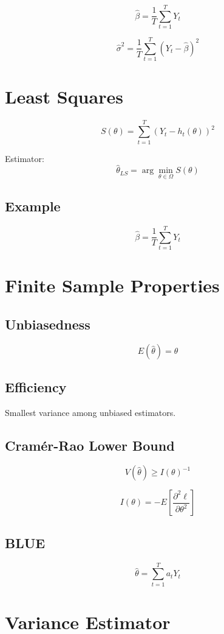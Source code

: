 \[
\hat{\beta} = \frac{1}{T} \sum_{t=1}^T Y_t
\]

\[
\hat{\sigma}^2 = \frac{1}{T} \sum_{t=1}^T (Y_t - \hat{\beta})^2
\]

\section{Least Squares}

\[
S(\theta) = \sum_{t=1}^T (Y_t - h_t(\theta))^2
\]

Estimator:
\[
\hat{\theta}_{LS} = \arg\min_{\theta \in \Omega} S(\theta)
\]

\subsection{Example}

\[
\hat{\beta} = \frac{1}{T} \sum_{t=1}^T Y_t
\]

\section{Finite Sample Properties}

\subsection{Unbiasedness}

\[
E(\hat{\theta}) = \theta
\]

\subsection{Efficiency}

Smallest variance among unbiased estimators.

\subsection{Cram\'er-Rao Lower Bound}

\[
V(\hat{\theta}) \ge I(\theta)^{-1}
\]

\[
I(\theta) = -E\left[\frac{\partial^2 \ell}{\partial \theta^2}\right]
\]

\subsection{BLUE}

\[
\hat{\theta} = \sum_{t=1}^T a_t Y_t
\]

\section{Variance Estimator}

